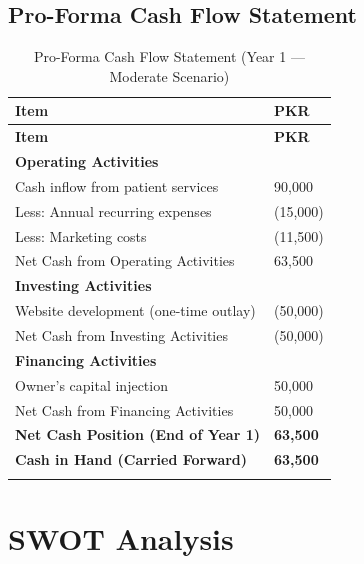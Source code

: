 \documentclass[12pt, a4paper]{article}
\begin{document}
\subsection{Pro-Forma Cash Flow Statement}

\begin{longtable}{@{} L{9cm} R{5.4cm} @{}}
\toprule
\textbf{Item} & \textbf{PKR} \\
\midrule
\endfirsthead
\toprule
\textbf{Item} & \textbf{PKR} \\
\midrule
\endhead
\textbf{Operating Activities} & \\[2pt]
Cash inflow from patient services & 90,000 \\[4pt]
Less: Annual recurring expenses & (15,000) \\[4pt]
Less: Marketing costs & (11,500) \\
\midrule
Net Cash from Operating Activities & 63,500 \\[6pt]
\textbf{Investing Activities} & \\[2pt]
Website development (one-time outlay) & (50,000) \\
\midrule
Net Cash from Investing Activities & (50,000) \\[6pt]
\textbf{Financing Activities} & \\[2pt]
Owner's capital injection & 50,000 \\
\midrule
Net Cash from Financing Activities & 50,000 \\
\midrule
\textbf{Net Cash Position (End of Year 1)} & \textbf{63,500} \\
\textbf{Cash in Hand (Carried Forward)} & \textbf{63,500} \\
\bottomrule
\caption{Pro-Forma Cash Flow Statement (Year 1 — Moderate Scenario)}
\end{longtable}

\newpage

\section{SWOT Analysis}
\end{document}
